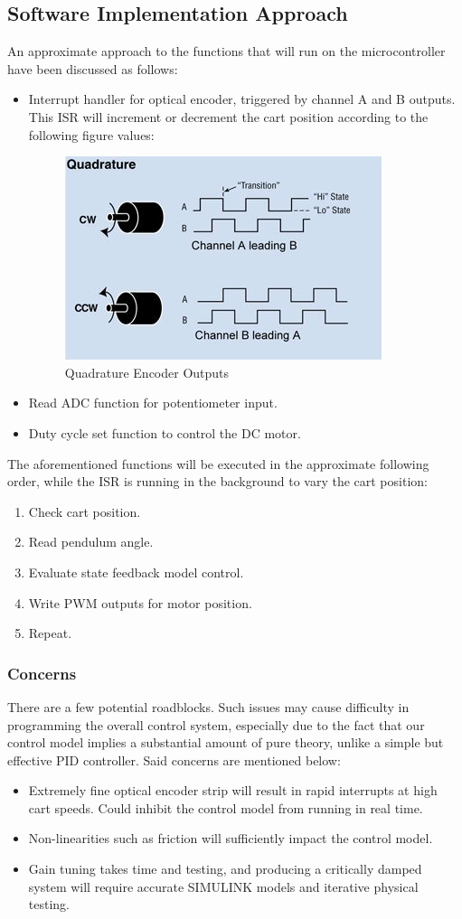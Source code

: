 \documentclass[12pt]{article}
\begin{document}
\subsection{Software Implementation Approach}
An approximate approach to the functions that will run on the microcontroller have been discussed as follows:
\begin{itemize}
    \item Interrupt handler for optical encoder, triggered by channel A and B outputs. This ISR will increment or decrement the cart position according to the following figure values:
    \begin{figure}[H]
        \centering
        \includegraphics[width=.5\linewidth]{figures/quadrature.jpg}
        \caption{Quadrature Encoder Outputs \cite{quadref}}
        \label{fig:quad}
    \end{figure}
    \item Read ADC function for potentiometer input.
    \item Duty cycle set function to control the DC motor.
\end{itemize}
The aforementioned functions will be executed in the approximate following order, while the ISR is running in the background to vary the cart position:
\begin{enumerate}
    \item Check cart position.
    \item Read pendulum angle.
    \item Evaluate state feedback model control.
    \item Write PWM outputs for motor position.
    \item Repeat.
\end{enumerate}
\subsubsection{Concerns}
\label{conc}
There are a few potential roadblocks. Such issues may cause difficulty in programming the overall control system, especially due to the fact that our control model implies a substantial amount of pure theory, unlike a simple but effective PID controller. Said concerns are mentioned below:
\begin{itemize}
    \item Extremely fine optical encoder strip will result in rapid interrupts at high cart speeds. Could inhibit the control model from running in real time.
    \item Non-linearities such as friction will sufficiently impact the control model.
    \item Gain tuning takes time and testing, and producing a critically damped system will require accurate SIMULINK models and iterative physical testing.
\end{itemize}
\end{document}
